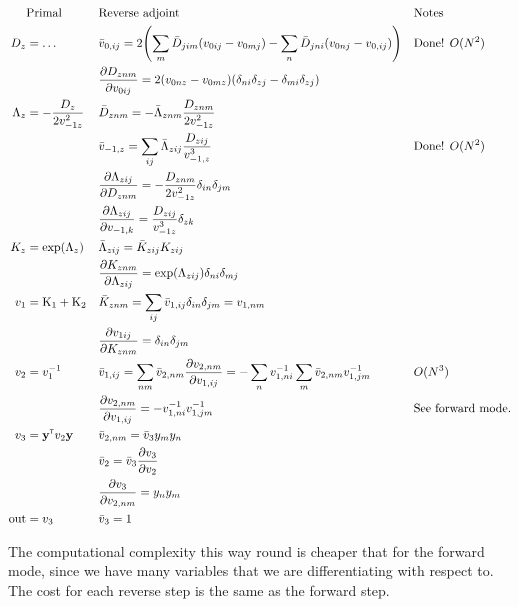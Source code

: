 \begin{align}
&\text{Primal} && \text{Reverse adjoint} && \text{Notes} \nonumber \\
D_z &= \dots && \bar v_{0,ij} = 2\left(\sum_{m} \bar D_{jim} (v_{0ij} - v_{0mj}) - \sum_{n} \bar D_{jni} (v_{0nj} - v_{0,ij})\right) && \text{Done! } O(N^2) \\
& && \pderiv[D_{znm}]{v_{0ij}} = 2(v_{0nz} - v_{0mz})(\delta_{ni}\delta_{zj} - \delta_{mi}\delta_{zj}) &&\\
\Lambda_z &= - \frac{D_z}{2v_{-1z}^2} && \bar D_{znm} = -\bar \Lambda_{znm} \frac{D_{znm}}{2v_{-1z}^2} && \\
& && \bar v_{-1,z} = \sum_{ij} \bar \Lambda_{zij} \frac{D_{zij}}{v_{-1,z}^3}  && \text{Done! } O(N^2)  \\
& && \pderiv[\Lambda_{zij}]{D_{znm}} = -\frac{D_{znm}}{2v_{-1z}^2}\delta_{in}\delta_{jm}  && \\
& && \pderiv[\Lambda_{zij}]{v_{-1,k}} = \frac{D_{zij}}{v_{-1z}^3} \delta_{zk} && \\
K_z &= \exp(\Lambda_z) && \bar \Lambda_{zij} = \bar K_{zij} K_{zij} && \\
& && \pderiv[K_{znm}]{\Lambda_{zij}} = \exp(\Lambda_{zij})\delta_{ni}\delta_{mj} && \\
v_1 &= \mat K_1 + \mat K_2 && \bar K_{znm} = \sum_{ij} \bar v_{1,ij} \delta_{in}\delta_{jm} = v_{1,nm} && \\
& && \pderiv[v_{1ij}]{K_{znm}} = \delta_{in}\delta_{jm} && \\
v_2&= v_1\inv && \bar v_{1,ij} = \sum_{nm} \bar v_{2,nm} \pderiv[v_{2,nm}]{v_{1,ij}} = -\sum_{n} v_{1,ni}\inv \sum_m \bar v_{2,nm} v_{1,jm}\inv && O(N^3) \\
& && \pderiv[v_{2,nm}]{v_{1,ij}} = -v_{1,ni}\inv v_{1,jm}\inv && \text{See forward mode.} \\
v_3 &= \vy\transpose v_2 \vy && \bar v_{2,nm} = \bar v_3 y_my_n && \\
& && \bar v_2 = \bar v_3\pderiv[v_3]{v_{2}} && \\
& && \pderiv[v_3]{v_{2,nm}} = y_ny_m  && \\
\text{out} &= v_3 && \bar v_3 = 1 &&
\end{align}

The computational complexity this way round is cheaper that for the forward mode, since we have many variables that we are differentiating with respect to. The cost for each reverse step is the same as the forward step.




